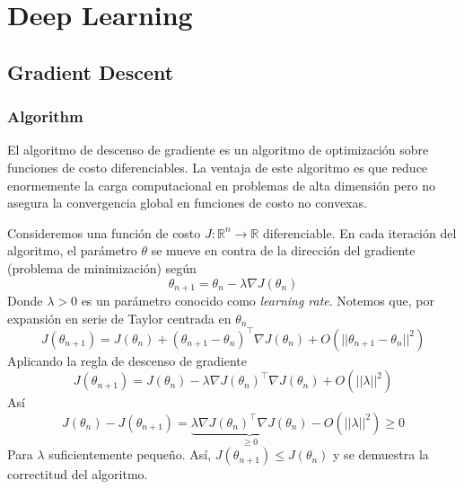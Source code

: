 \chapter{Deep Learning}

\section{Gradient Descent}

\subsection{Algorithm}

El algoritmo de descenso de gradiente es un algoritmo de optimización sobre funciones de costo diferenciables. La ventaja de este algoritmo es que reduce enormemente la carga computacional en problemas de alta dimensión pero no asegura la convergencia global en funciones de costo no convexas. 

Consideremos una función de costo $J: \mathbb{R}^n \rightarrow \mathbb{R}$ diferenciable. En cada iteración del algoritmo, el parámetro $\theta$ se mueve en contra de la dirección del gradiente (problema de minimización) según
$$ 
\theta_{n+1} = \theta_n - \lambda \nabla J(\theta_n)
$$
Donde $\lambda > 0$ es un parámetro conocido como \textit{learning rate}. Notemos que, por expansión en serie de Taylor  centrada en $\theta_{n}$
$$ 
J(\theta_{n+1}) = J(\theta_{n}) + (\theta_{n+1} - \theta_{n})^{\top}\nabla J(\theta_n) + O(||\theta_{n+1} - \theta_{n}||^2)
$$
Aplicando la regla de descenso de gradiente 
$$ 
J(\theta_{n+1}) =  J(\theta_{n}) - \lambda \nabla J(\theta_n)^{\top}\nabla J(\theta_n) + O(||\lambda||^2) 
$$
Así 
$$
J(\theta_{n}) - J(\theta_{n+1}) = \underbrace{\lambda\nabla J(\theta_n)^{\top}\nabla J(\theta_n)}_{\geq 0} - O(||\lambda||^2)  \geq 0 
$$
Para $\lambda$ suficientemente pequeño. Así, $J(\theta_{n+1}) \leq J(\theta_n)$ y se demuestra la correctitud del algoritmo. 


